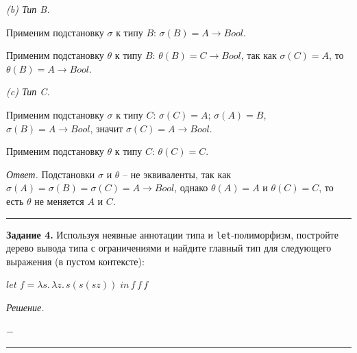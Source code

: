 \documentclass[landscape, 11pt]{report}
\begin{document}
	\vspace{0.2cm}
	
	\textit{(b) Тип B.}
	
	\vspace{0.15cm}
	
	Применим подстановку $\sigma$ к типу $B$: $\sigma(B) = A \rightarrow Bool$.
	
	Применим подстановку $\theta$ к типу $B$: $\theta(B) = C \rightarrow Bool$, так как $\sigma(C) = A$, то $\theta(B) = A \rightarrow Bool$.
	
	\vspace{0.2cm}
	
	\textit{(c) Тип C.}
	
	\vspace{0.15cm}
	
	Применим подстановку $\sigma$ к типу $C$: $\sigma(C) = A$; $\sigma(A) = B$, $\sigma(B) = A \rightarrow Bool$, значит $\sigma(C) = A \rightarrow Bool$.
	
	Применим подстановку $\theta$ к типу $C$: $\theta(C) = C$.
	
	\vspace{0.2cm}
	
	\textit{Ответ.} Подстановки $\sigma$ и $\theta$ -- не эквиваленты, так как $\sigma(A) = \sigma(B) = \sigma(C) = A \rightarrow Bool$, однако $\theta(A) = A$ и $\theta(C) = C$, то есть $\theta$ не меняется $A$ и $C$.

	\vspace{0.5cm}
	\hrule
	\vspace{0.5cm}
	
	
	\textbf{Задание 4.} Используя неявные аннотации типа и \verb|let|-полиморфизм, постройте дерево вывода типа с ограничениями и найдите главный тип для следующего выражения (в пустом контексте):
	
	\begin{center}
		$let \; f = \lambda s . \, \lambda z . \, s (s (s z)) \; in \, f \, f \, f$
	\end{center}

	\textit{Решение.}
	
	\vspace{0.5cm}
	
	\begin{center}
		$-$
	\end{center}
	
	\vspace{0.5cm}
	\hrule
	
\end{document}
